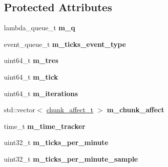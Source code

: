 \subsection*{Protected Attributes}
\begin{DoxyCompactItemize}
\item 
\mbox{\label{classmods_1_1deferred_a15b135f48b152a064999f9dd8dc626df}} 
lambda\+\_\+queue\+\_\+t {\bfseries m\+\_\+q}
\item 
\mbox{\label{classmods_1_1deferred_acee225ce2a7420f7a908cda9800cf995}} 
event\+\_\+queue\+\_\+t {\bfseries m\+\_\+ticks\+\_\+event\+\_\+type}
\item 
\mbox{\label{classmods_1_1deferred_ac5ed1e7ab579051b0ab6c818c40ffa3e}} 
uint64\+\_\+t {\bfseries m\+\_\+tres}
\item 
\mbox{\label{classmods_1_1deferred_af5684e7324675feceb9da6458c45329a}} 
uint64\+\_\+t {\bfseries m\+\_\+tick}
\item 
\mbox{\label{classmods_1_1deferred_a527a2c28739e016124a69a61ad304938}} 
uint64\+\_\+t {\bfseries m\+\_\+iterations}
\item 
\mbox{\label{classmods_1_1deferred_a0fb7e18edeafd39ee36a5fef8b98a6fc}} 
std\+::vector$<$ \hyperlink{structmods_1_1chunk__affect__t}{chunk\+\_\+affect\+\_\+t} $>$ {\bfseries m\+\_\+chunk\+\_\+affect}
\item 
\mbox{\label{classmods_1_1deferred_a14b7e71f530a3a161701b39612a53628}} 
time\+\_\+t {\bfseries m\+\_\+time\+\_\+tracker}
\item 
\mbox{\label{classmods_1_1deferred_a9fb6bf3795f93550fdfb421cee3238da}} 
uint32\+\_\+t {\bfseries m\+\_\+ticks\+\_\+per\+\_\+minute}
\item 
\mbox{\label{classmods_1_1deferred_a1212320a6fcb731de6889e2c2c73ef39}} 
uint32\+\_\+t {\bfseries m\+\_\+ticks\+\_\+per\+\_\+minute\+\_\+sample}
\end{DoxyCompactItemize}


